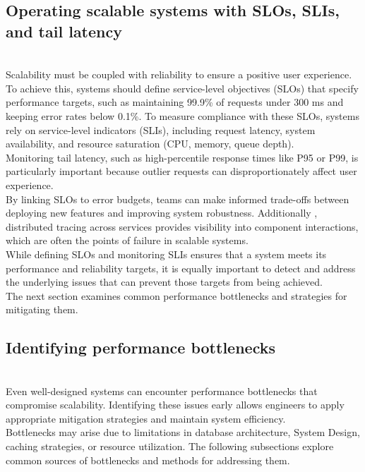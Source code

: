 \subsection{Operating scalable systems with SLOs, SLIs, and tail latency}\label{-zxus-xqXg2ybAw7p9V3Z}
\\
Scalability must be coupled with reliability to ensure a positive user experience.
\\
To achieve this, systems should define service-level objectives (SLOs) that specify performance targets, such as maintaining 99.9\% of requests under 300 ms and keeping error rates below 0.1\%. To measure compliance with these SLOs, systems rely on service-level indicators (SLIs), including request latency, system availability, and resource saturation (CPU, memory, queue depth).
\\
Monitoring tail latency, such as high-percentile response times like P95 or P99, is particularly important because outlier requests can disproportionately affect user experience.
\\
By linking SLOs to error budgets, teams can make informed trade-offs between deploying new features and improving system robustness. Additionally , distributed tracing across services provides visibility into component interactions, which are often the points of failure in scalable systems.
\\
While defining SLOs and monitoring SLIs ensures that a system meets its performance and reliability targets, it is equally important to detect and address the underlying issues that can prevent those targets from being achieved.
\\
The next section examines common performance bottlenecks and strategies for mitigating them.

\subsection{Identifying performance bottlenecks}\label{TSkPOrTDNzbjjoFGgRrwg}
\\
Even well-designed systems can encounter performance bottlenecks that compromise scalability. Identifying these issues early allows engineers to apply appropriate mitigation strategies and maintain system efficiency.
\\
Bottlenecks may arise due to limitations in database architecture, System Design, caching strategies, or resource utilization. The following subsections explore common sources of bottlenecks and methods for addressing them.

